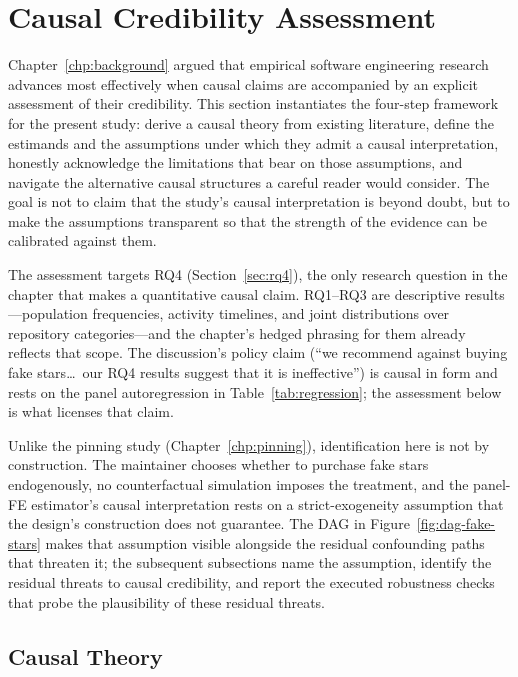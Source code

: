 \section{Causal Credibility Assessment}
\label{sec:fake-stars-credibility}

Chapter~\ref{chp:background} argued that empirical software engineering research advances most effectively when causal claims are accompanied by an explicit assessment of their credibility.
This section instantiates the four-step framework for the present study: derive a causal theory from existing literature, define the estimands and the assumptions under which they admit a causal interpretation, honestly acknowledge the limitations that bear on those assumptions, and navigate the alternative causal structures a careful reader would consider.
The goal is not to claim that the study's causal interpretation is beyond doubt, but to make the assumptions transparent so that the strength of the evidence can be calibrated against them.

The assessment targets RQ4 (Section~\ref{sec:rq4}), the only research question in the chapter that makes a quantitative causal claim.
RQ1--RQ3 are descriptive results---population frequencies, activity timelines, and joint distributions over repository categories---and the chapter's hedged phrasing for them already reflects that scope.
The discussion's policy claim (``we recommend against buying fake stars\dots\ our RQ4 results suggest that it is ineffective'') is causal in form and rests on the panel autoregression in Table~\ref{tab:regression}; the assessment below is what licenses that claim.

Unlike the pinning study (Chapter~\ref{chp:pinning}), identification here is not by construction.
The maintainer chooses whether to purchase fake stars endogenously, no counterfactual simulation imposes the treatment, and the panel-FE estimator's causal interpretation rests on a strict-exogeneity assumption that the design's construction does not guarantee.
The DAG in Figure~\ref{fig:dag-fake-stars} makes that assumption visible alongside the residual confounding paths that threaten it; the subsequent subsections name the assumption, identify the residual threats to causal credibility, and report the executed robustness checks that probe the plausibility of these residual threats.

\subsection{Causal Theory}
\label{sec:fake-stars-credibility-theory}


